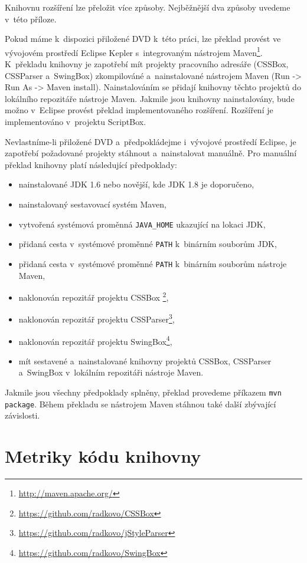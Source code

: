 Knihovnu rozšíření lze přeložit více způsoby. Nejběžnější dva způsoby uvedeme v~této příloze.

Pokud máme k~dispozici přiložené DVD k~této práci, lze překlad provést ve vývojovém prostředí Eclipse Kepler s~integrovaným nástrojem Maven\footnote{\url{http://maven.apache.org/}}. K~překladu knihovny je zapotřebí mít projekty pracovního adresáře (CSSBox, CSSParser a~SwingBox) zkompilováné a~nainstalované nástrojem Maven (Run -> Run As -> Maven install). Nainstalováním se přidají knihovny těchto projektů do lokálního repozitáře nástroje Maven. Jakmile jsou knihovny nainstalovány, bude možno v~Eclipse provést překlad implementovaného rozšíření. Rozšíření je implementováno v~projektu ScriptBox.

Nevlastníme-li přiložené DVD a~předpokládejme i~vývojové prostředí Eclipse, je zapotřebí požadované projekty stáhnout a~nainstalovat manuálně. Pro manuální překlad knihovny platí následující předpoklady:

\begin{itemize}
  \item nainstalované JDK 1.6 nebo novější, kde JDK 1.8 je doporučeno,
  \item nainstalovaný sestavovací systém Maven,
  \item vytvořená systémová proměnná \texttt{JAVA\_HOME} ukazující na lokaci JDK,
  \item přidaná cesta v~systémové proměnné \texttt{PATH} k~binárním souborům JDK,
  \item přidaná cesta v~systémové proměnné \texttt{PATH} k~binárním souborům nástroje Maven,
  \item naklonován repozitář projektu CSSBox \footnote{\url{https://github.com/radkovo/CSSBox}},
  \item naklonován repozitář projektu CSSParser\footnote{\url{https://github.com/radkovo/jStyleParser}},
  \item naklonován repozitář projektu SwingBox\footnote{\url{https://github.com/radkovo/SwingBox}},
  \item mít sestavené a~nainstalované knihovny projektů CSSBox, CSSParser a~SwingBox v~lokálním repozitáři nástroje Maven.
\end{itemize}

Jakmile jsou všechny předpoklady splněny, překlad provedeme příkazem \texttt{mvn package}. Během překladu se nástrojem Maven stáhnou také další zbývající závislosti. 

\chapter{Metriky kódu knihovny}
\label{Annex.metrics}

